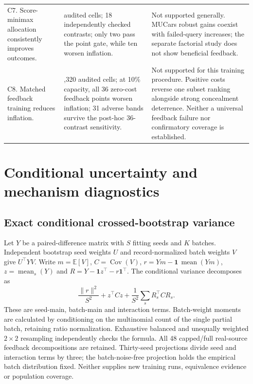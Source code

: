 \documentclass[11pt]{article}
\begin{document}
\begin{longtable}{>{\raggedright\arraybackslash}p{}>{\raggedright\arraybackslash}p{}>{\raggedright\arraybackslash}p{}}
\addlinespace
C7. Score-minimax allocation consistently improves outcomes. & 108 audited cells; 18 independently checked contrasts; only two pass the point gate, while ten worsen inflation. & Not supported generally. MUCars robust gains coexist with failed-query increases; the separate factorial study does not show beneficial feedback.\\
\addlinespace
C8. Matched feedback training reduces inflation. & 4,320 audited cells; at 10\% capacity, all 36 zero-cost feedback points worsen inflation; 31 adverse bands survive the post-hoc 36-contrast sensitivity. & Not supported for this training procedure. Positive costs reverse one subset ranking alongside strong concealment deterrence. Neither a universal feedback failure nor confirmatory coverage is established.\\
\bottomrule
\end{longtable}
\normalsize

\section{Conditional uncertainty and mechanism diagnostics}\label{app:mechanism_diagnostics}
\subsection{Exact conditional crossed-bootstrap variance}
Let $Y$ be a paired-difference matrix with $S$ fitting seeds and $K$ batches.
Independent bootstrap seed weights $U$ and record-normalized batch weights
$V$ give $U^\top YV$. Write $m=\mathbb E[V]$, $C=\operatorname{Cov}(V)$,
$r=Ym-\mathbf1\,\operatorname{mean}(Ym)$,
$z=\operatorname{mean}_{s}(Y)$ and
$R=Y-\mathbf1z^\top-r\mathbf1^\top$. The conditional variance decomposes as
\[
 \frac{\|r\|^2}{S^2}+z^\top Cz+
 \frac{1}{S^2}\sum_s R_s^\top C R_s.
\]
These are seed-main, batch-main and interaction terms. Batch-weight moments
are calculated by conditioning on the multinomial count of the single
partial batch, retaining ratio normalization. Exhaustive balanced and
unequally weighted $2\times2$ resampling independently checks the formula.
All 48 capped/full real-source feedback decompositions are retained.
Thirty-seed projections divide seed and interaction terms by three; the
batch-noise-free projection holds the empirical batch distribution fixed.
Neither supplies new training runs, equivalence evidence or population coverage.
\end{document}
